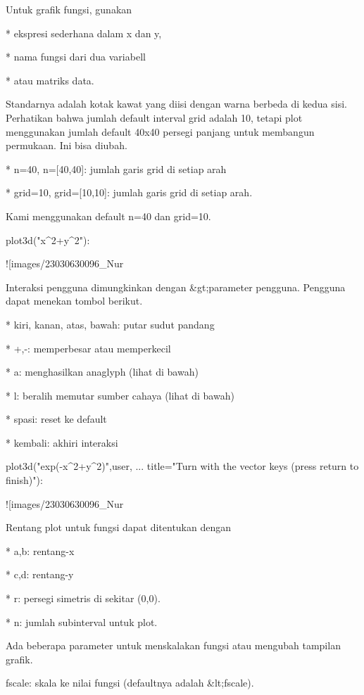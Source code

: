 \documentclass{article}
\begin{document}
Untuk grafik fungsi, gunakan


* 
ekspresi sederhana dalam x dan y,

* 
nama fungsi dari dua variabell

* 
atau matriks data.


Standarnya adalah kotak kawat yang diisi dengan warna berbeda di kedua
sisi. Perhatikan bahwa jumlah default interval grid adalah 10, tetapi
plot menggunakan jumlah default 40x40 persegi panjang untuk membangun
permukaan. Ini bisa diubah.


* 
n=40, n=[40,40]: jumlah garis grid di setiap arah

* 
grid=10, grid=[10,10]: jumlah garis grid di setiap arah.


Kami menggunakan default n=40 dan grid=10.


\>plot3d("x^2+y^2"):


![images/23030630096_Nur%

Interaksi pengguna dimungkinkan dengan &gt;parameter pengguna. Pengguna
dapat menekan tombol berikut.


* 
kiri, kanan, atas, bawah: putar sudut pandang

* 
+,-: memperbesar atau memperkecil

* 
a: menghasilkan anaglyph (lihat di bawah)

* 
l: beralih memutar sumber cahaya (lihat di bawah)

* 
spasi: reset ke default

* 
kembali: akhiri interaksi


\>plot3d("exp(-x^2+y^2)",\>user, ...  
\>     title="Turn with the vector keys (press return to finish)"):


![images/23030630096_Nur%

Rentang plot untuk fungsi dapat ditentukan dengan


* 
a,b: rentang-x

* 
c,d: rentang-y

* 
r: persegi simetris di sekitar (0,0).

* 
n: jumlah subinterval untuk plot.


Ada beberapa parameter untuk menskalakan fungsi atau mengubah tampilan
grafik.


fscale: skala ke nilai fungsi (defaultnya adalah &lt;fscale).
\end{document}
